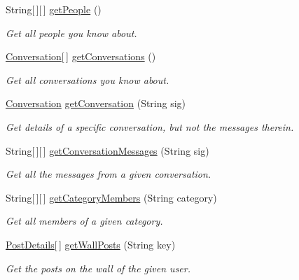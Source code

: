 \begin{DoxyCompactItemize}
String\mbox{[}$\,$\mbox{]}\mbox{[}$\,$\mbox{]} \hyperlink{classballmerpeak_1_1turtlenet_1_1server_1_1TurtlenetImpl_a5c033785fd6e598229c23c5c08b805ba}{get\-People} ()
\begin{DoxyCompactList}\small\item\em Get all people you know about. \end{DoxyCompactList}\item 
\hyperlink{classballmerpeak_1_1turtlenet_1_1shared_1_1Conversation}{Conversation}\mbox{[}$\,$\mbox{]} \hyperlink{classballmerpeak_1_1turtlenet_1_1server_1_1TurtlenetImpl_a3b7c5b806f0a79198d3042964bf614c1}{get\-Conversations} ()
\begin{DoxyCompactList}\small\item\em Get all conversations you know about. \end{DoxyCompactList}\item 
\hyperlink{classballmerpeak_1_1turtlenet_1_1shared_1_1Conversation}{Conversation} \hyperlink{classballmerpeak_1_1turtlenet_1_1server_1_1TurtlenetImpl_a70dcea522454279983e72b0fd5c3e9a6}{get\-Conversation} (String sig)
\begin{DoxyCompactList}\small\item\em Get details of a specific conversation, but not the messages therein. \end{DoxyCompactList}\item 
String\mbox{[}$\,$\mbox{]}\mbox{[}$\,$\mbox{]} \hyperlink{classballmerpeak_1_1turtlenet_1_1server_1_1TurtlenetImpl_ac92b6c500d8f9f2b0457e99005bf7674}{get\-Conversation\-Messages} (String sig)
\begin{DoxyCompactList}\small\item\em Get all the messages from a given conversation. \end{DoxyCompactList}\item 
String\mbox{[}$\,$\mbox{]}\mbox{[}$\,$\mbox{]} \hyperlink{classballmerpeak_1_1turtlenet_1_1server_1_1TurtlenetImpl_a4ec6b30f0a39631b060273ce493e3a22}{get\-Category\-Members} (String category)
\begin{DoxyCompactList}\small\item\em Get all members of a given category. \end{DoxyCompactList}\item 
\hyperlink{classballmerpeak_1_1turtlenet_1_1shared_1_1PostDetails}{Post\-Details}\mbox{[}$\,$\mbox{]} \hyperlink{classballmerpeak_1_1turtlenet_1_1server_1_1TurtlenetImpl_a25cd6a95e1664bd10cac1ecad0c985df}{get\-Wall\-Posts} (String key)
\begin{DoxyCompactList}\small\item\em Get the posts on the wall of the given user. \end{DoxyCompactList}\item 

\end{DoxyCompactItemize}
